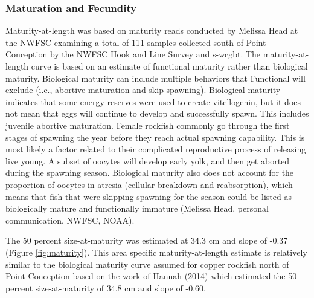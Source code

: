 \documentclass[11pt,
  english,
  a4paper,
]{article}
\begin{document}
\leavevmode\tagmcend\tagstructend\par


\hypertarget{maturation-and-fecundity}{%
\subsubsection{Maturation and Fecundity}\label{maturation-and-fecundity}}

\leavevmode\tagmcend\tagstructend


Maturity-at-length was based on maturity reads conducted by Melissa Head at the NWFSC examining a total of 111 samples collected south of Point Conception by the NWFSC Hook and Line Survey and \Gls{s-wcgbt}. The maturity-at-length curve is based on an estimate of functional maturity rather than biological maturity. Biological maturity can include multiple behaviors that Functional will exclude (i.e., abortive maturation and skip spawning). Biological maturity indicates that some energy reserves were used to create vitellogenin, but it does not mean that eggs will continue to develop and successfully spawn. This includes juvenile abortive maturation. Female rockfish commonly go through the first stages of spawning the year before they reach actual spawning capability. This is most likely a factor related to their complicated reproductive process of releasing live young. A subset of oocytes will develop early yolk, and then get aborted during the spawning season. Biological maturity also does not account for the proportion of oocytes in atresia (cellular breakdown and reabsorption), which means that fish that were skipping spawning for the season could be listed as biologically mature and functionally immature (Melissa Head, personal communication, NWFSC, NOAA).

\leavevmode\tagmcend\tagstructend\par


The 50 percent size-at-maturity was estimated at 34.3 cm and slope of -0.37 (Figure \ref{fig:maturity}). This area specific maturity-at-length estimate is relatively similar to the biological maturity curve assumed for copper rockfish north of Point Conception based on the work of Hannah {(2014)\leavevmode\tagmcend\tagstructend} which estimated the 50 percent size-at-maturity of 34.8 cm and slope of -0.60.
\end{document}
